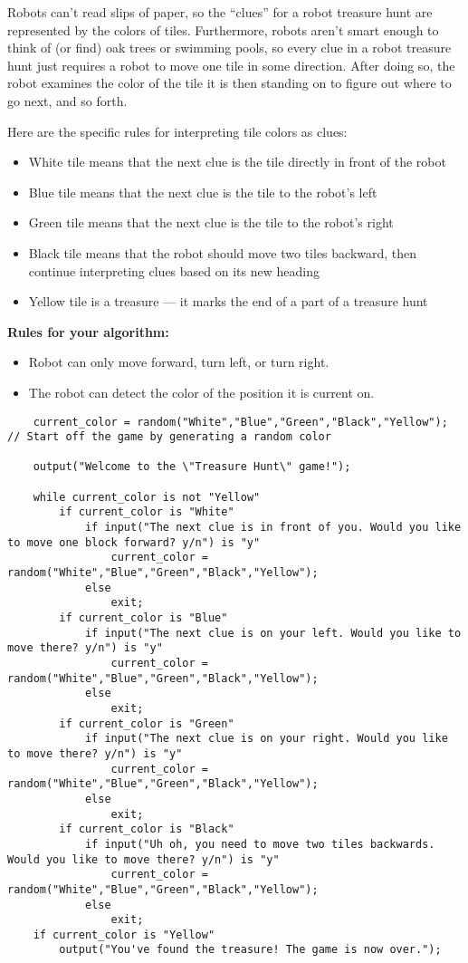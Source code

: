\documentclass{article}
\begin{document}
\begin{enumerate}
		Robots can’t read slips of paper, so the “clues” for a robot treasure hunt are represented by the colors of tiles. Furthermore, robots aren’t smart enough to think of (or find) oak trees or swimming pools, so every clue in a robot treasure hunt just requires a robot to move one tile in some direction. After doing so, the robot examines the color of the tile it is then standing on to figure out where to go next, and so forth.\newline
		
		Here are the specific rules for interpreting tile colors as clues:
		
		\begin{itemize}
			\item White tile means that the next clue is the tile directly in front of the robot
			\item Blue tile means that the next clue is the tile to the robot’s left
			\item Green tile means that the next clue is the tile to the robot’s right
			\item Black tile means that the robot should move two tiles backward, then
continue interpreting clues based on its new heading
			\item Yellow tile is a treasure — it marks the end of a part of a treasure hunt
		\end{itemize}
		
		\textbf{Rules for your algorithm:}
		\begin{itemize}
			\item Robot can only move forward, turn left, or turn right.
			\item The robot can detect the color of the position it is current on.
		\end{itemize}
		
\begin{lstlisting}
	current_color = random("White","Blue","Green","Black","Yellow"); // Start off the game by generating a random color
	
	output("Welcome to the \"Treasure Hunt\" game!");
	
	while current_color is not "Yellow"
		if current_color is "White"
			if input("The next clue is in front of you. Would you like to move one block forward? y/n") is "y"
				current_color = random("White","Blue","Green","Black","Yellow");
			else
				exit;
		if current_color is "Blue"
			if input("The next clue is on your left. Would you like to move there? y/n") is "y"
				current_color = random("White","Blue","Green","Black","Yellow");
			else
				exit;
		if current_color is "Green"
			if input("The next clue is on your right. Would you like to move there? y/n") is "y"
				current_color = random("White","Blue","Green","Black","Yellow");
			else
				exit;
		if current_color is "Black"
			if input("Uh oh, you need to move two tiles backwards. Would you like to move there? y/n") is "y"
				current_color = random("White","Blue","Green","Black","Yellow");
			else
				exit;
	if current_color is "Yellow"
		output("You've found the treasure! The game is now over.");
	 
\end{lstlisting}
	
\end{enumerate}
\end{document}
